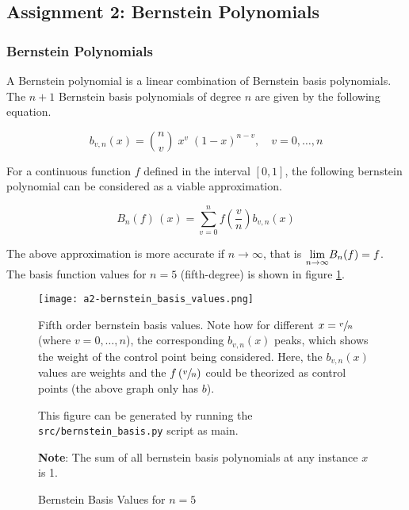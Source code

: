 
\subsection{Assignment 2: Bernstein Polynomials}
\subsubsection{Bernstein Polynomials}

A Bernstein polynomial is a linear combination of Bernstein basis polynomials. The $n+1$ Bernstein basis polynomials of degree $n$ are given by the following equation.

\begin{equation}
    b_{v,n}(x) = \binom{n}{v} \; x^v \; (1-x)^{n-v}, \quad v = 0,\dots,n
    \label{eq:bernstein-basis-term}
\end{equation}

For a continuous function $f$ defined in the interval $[0, 1]$, the following bernstein polynomial can be considered as a viable approximation.

\begin{equation}
    B_{n}(f)\,(x) = \sum_{v=0}^{n} f \left ( \frac{v}{n} \right ) b_{v, n} (x)
    \label{eq:bernstein-approx-func}
\end{equation}

The above approximation is more accurate if $n\rightarrow \infty$, that is $\underset{n \rightarrow \infty}{\textup{lim}} B_n(f) = f$.
The basis function values for $n=5$ (fifth-degree) is shown in figure \ref{fig:bernstein-basis-plots}.

\begin{figure}[ht]
    \centering
    \texttt{[image: a2-bernstein\_basis\_values.png]}
    \caption{Bernstein Basis Values for $n=5$}
    \label{fig:bernstein-basis-plots}
    \small
        Fifth order bernstein basis values. Note how for different $x = \sfrac{v}{n}$ (where $v = 0,\dots,n$), the corresponding $b_{v,n}(x)$ peaks, which shows the weight of the control point being considered. Here, the $b_{v,n}(x)$ values are weights and the $f\left(\sfrac{v}{n}\right)$ could be theorized as control points (the above graph only has $b$).

        This figure can be generated by running the \texttt{src/bernstein\_basis.py} script as main.

        \textbf{Note}: The sum of all bernstein basis polynomials at any instance $x$ is 1.
\end{figure}

